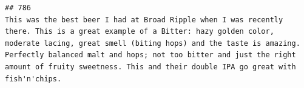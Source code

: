 \documentclass[
  a4paper,
]{article}
\begin{document}
\begin{verbatim}
## 786                                                                                                                                                                                                                                                                                                                                                                                                                                                                                                                                                                                                                                                                                                                                                                                                                                                                                                                                                                                                                                                                                                                                                                                                                                                                                                                                                                                                                            This was the best beer I had at Broad Ripple when I was recently there. This is a great example of a Bitter: hazy golden color, moderate lacing, great smell (biting hops) and the taste is amazing. Perfectly balanced malt and hops; not too bitter and just the right amount of fruity sweetness. This and their double IPA go great with fish'n'chips.

\end{verbatim}
\end{document}
